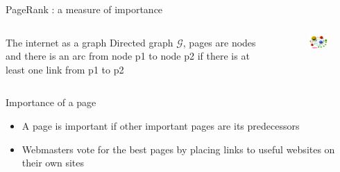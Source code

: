 \documentclass[10pt]{beamer}
\begin{document}
\begin{frame}{PageRank : a measure of importance}
\begin{columns}
    \begin{column}{5cm}
      \begin{block}{The internet as a graph}
        Directed graph $\mathcal{G}$, pages are nodes and there is an arc from node p1 to node p2 if there is at least one link from p1 to p2
      \end{block}
    \end{column}
    \begin{column}{5cm}
      \begin{figure}[r]
        \includegraphics[width =4.5cm]{PageRank-hi-res.png}
      \end{figure}
    \end{column}
  \end{columns}
\begin{block}{Importance of a page}
\begin{itemize}
\item A page is important if other important pages are its predecessors
\item Webmasters vote for the best pages by placing links to useful websites on their own sites
\end{itemize}
\end{block}
\end{frame}
\end{document}
